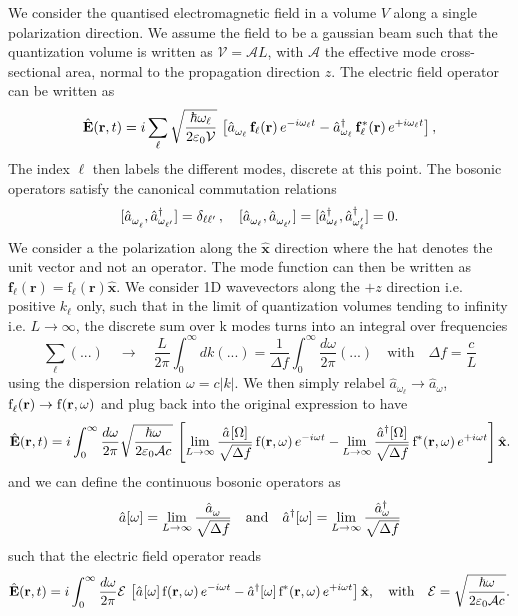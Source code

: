 We consider the quantised electromagnetic field in a volume $V$ along a single polarization direction. We assume the field to be a gaussian beam such that the quantization volume is written as $\mathcal{V} = \mathcal{A}L$, with $\mathcal{A} $ the effective mode cross-sectional area, normal to the propagation direction $z$. The electric field operator can be written as  
\begin{equation}
\hat{\mathbf{E}}(\mathbf{r}, t) 
= i \sum_{ \ell } \sqrt{\dfrac{\hbar \omega_{\ell}}{2 \varepsilon_0 \mathcal{V}}} \,
\left[ \hat{a}^{\vphantom{\dagger}}_{ \omega_\ell }\,\mathbf{f}_{\ell }(\mathbf{r})\,e^{-i\omega_{\ell} t} 
- \hat{a}_{\omega_\ell  }^\dagger\,\mathbf{f}_{\ell }^*(\mathbf{r})\,e^{+i\omega_{\ell} t} \right],
\end{equation}
The index $\ell$ then labels the different modes, discrete at this point. The bosonic operators satisfy the canonical commutation relations
\[
[\hat{a}_{\omega_{\ell\vphantom{'}}}^{\vphantom{\dagger}}, \hat{a}_{\omega_{\ell'}}^\dagger] = \delta_{\ell \ell'} \,, \quad
[\hat{a}_{\omega_\ell}^{\vphantom{\dagger}}, \hat{a}_{\omega_{\ell'}}^{\vphantom{\dagger}} ] = [\hat{a}_{\omega_\ell}^\dagger, \hat{a}_{\omega_\ell'}^\dagger] = 0.
\]
We consider a the polarization along the $\hat{\mathbf{x}}$ direction where the hat denotes the unit vector and not an operator. The mode function can then be written as $\mathbf{f}_{\ell }(\mathbf{r}) = \text{f}_{\ell}(\mathbf{r})\hat{\mathbf{x}}$. We consider 1D wavevectors along the $+z$ direction i.e. positive $k_\ell$ only, such that in the limit of quantization volumes tending to infinity i.e. $L \to \infty$, the discrete sum over k modes turns into an integral over frequencies
\[
\sum_{\ell} (...) \quad \to \quad  \frac{L}{2\pi} \int^{\infty}_0 dk (...) = \frac{1}{\Delta f} \int^{\infty}_0 \dfrac{d\omega}{2\pi} (...) \quad \text{with} \quad \Delta f = \dfrac{c}{L}
\]
using the dispersion relation $\omega = c |k|$. We then simply relabel $\hat a_{\omega_\ell} \to \hat a_\omega$,  $\text{f}_{\ell}^{\vphantom{*}}(\mathbf{r})\to \text{f}^{\vphantom{*}}(\mathbf{r}, \omega)$ and plug back into the original expression to have
\[
\hat{\mathbf{E}}(\mathbf{r}, t)
= i \int^{\infty}_0 \dfrac{d\omega}{2\pi} \sqrt{\dfrac{\hbar \omega}{2 \varepsilon_0 \mathcal{A} c}} \,
\left[ \lim_{L \to \infty}\dfrac{\hat a^{\vphantom{\dagger}}[\Omega]}{\sqrt{\Delta f}}\,\text{f}^{\vphantom{*}}(\mathbf{r}, \omega)\,e^{-i\omega t}
-  \lim_{L \to \infty}\dfrac{\hat a^{\dagger}[\Omega]}{\sqrt{\Delta f}}\,\text{f}^{*}(\mathbf{r}, \omega)\,e^{+i\omega t} \right] \hat{\mathbf{x}}.
\]
and we can define the continuous bosonic operators as
\[\hat{a}[\omega] =  \lim_{L \to \infty}\dfrac{\hat{a}^{\vphantom{\dagger}}_{ \omega}}{\sqrt{\Delta f}} \quad \text{and} \quad \hat{a}^\dagger[\omega] =  \lim_{L \to \infty} \dfrac{\hat{a}^{\dagger}_{ \omega}}{\sqrt{\Delta f}}\]
such that the electric field operator reads
\[
\hat{\mathbf{E}}(\mathbf{r}, t) = i \int^{\infty}_0 \dfrac{d\omega}{2\pi} \mathcal{E} \,\left[ \hat{a}^{\vphantom{\dagger}}[\omega]\,\text{f}^{\vphantom{*}}(\mathbf{r}, \omega)\,e^{-i\omega t}
- \hat{a}^\dagger[\omega]\,\text{f}^{*}(\mathbf{r}, \omega)\,e^{+i\omega t} \right] \hat{\mathbf{x}}, \quad \text{with} \quad \mathcal{E} = \sqrt{\dfrac{\hbar \omega}{2 \varepsilon_0 \mathcal{A} c}}.
\]


